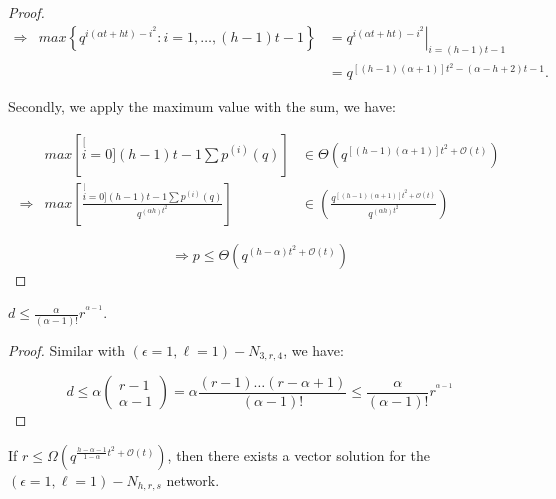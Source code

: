 \begin{proof}
\begin{eqnarray*}
\Rightarrow & max\left\{ q^{i(\alpha t+ht)-i^{2}}:i=1,\ldots,(h-1)t-1\right\}  & =\left.q^{i(\alpha t+ht)-i^{2}}\right|_{i=(h-1)t-1}\\
 &  & =q^{\left[\left(h-1\right)\left(\alpha+1\right)\right]t^{2}-\left(\alpha-h+2\right)t-1}.
\end{eqnarray*}

Secondly, we apply the maximum value with the sum, we have:

\begin{eqnarray*}
 & max\left[\stackrel[i=0]{(h-1)t-1}{\mathop{\sum}}p^{(i)}(q)\right] & \in\Theta\left(q^{\left[\left(h-1\right)\left(\alpha+1\right)\right]t^{2}+\mathcal{O}(t)}\right)\\
\Rightarrow & max\left[\frac{\stackrel[i=0]{(h-1)t-1}{\mathop{\sum}}p^{(i)}(q)}{q^{\left(\alpha h\right)t^{2}}}\right] & \in\left(\frac{q^{\left[\left(h-1\right)\left(\alpha+1\right)\right]t^{2}+\mathcal{O}(t)}}{q^{\left(\alpha h\right)t^{2}}}\right)
\end{eqnarray*}

\[
\Rightarrow p\leq\Theta\left(q^{\left(h-\alpha\right)t^{2}+\mathcal{O}(t)}\right)
\]
\end{proof}
\begin{lem}
$d\leq\frac{\alpha}{\left(\alpha-1\right)!}r^{^{\alpha-1}}$\label{lem:d_e1l1}.
\end{lem}
\begin{proof}
Similar with $\left(\epsilon=1,\ell=1\right)-\ensuremath{N}_{3,r,4}$,
we have:

\[
d\leq\alpha\left(\begin{array}{c}
r-1\\
\alpha-1
\end{array}\right)=\alpha\frac{\left(r-1\right)\ldots\left(r-\alpha+1\right)}{\left(\alpha-1\right)!}\leq\frac{\alpha}{\left(\alpha-1\right)!}r^{^{\alpha-1}}
\]
\end{proof}
\begin{thm}
If $r\leq\Omega\left(q^{\frac{h-\alpha-1}{1-\alpha}t^{2}+\mathcal{O}(t)}\right)$,
then there exists a vector solution for the $\left(\epsilon=1,\ell=1\right)-\ensuremath{N}_{h,r,s}$
network.
\end{thm}
